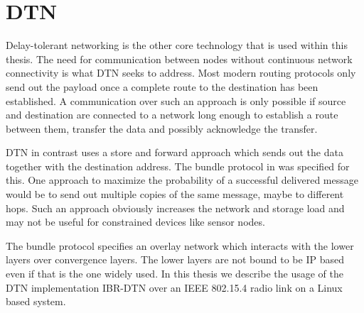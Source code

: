 \section{DTN}
\label{introdtn}
Delay-tolerant networking is the other core technology that is used within this
thesis. The need for communication between nodes without continuous network
connectivity is what DTN seeks to address. Most modern routing protocols only
send out the payload once a complete route to the destination has been established.
A communication over such an approach is only possible if source and destination
are connected to a network long enough to establish a route between them,
transfer the data and possibly acknowledge the transfer.

DTN in contrast uses a store and forward approach which sends out the data
together with the destination address. The bundle protocol in
\cite{RFC5050} was specified for this. One approach to maximize the probability
of a successful delivered message would be to send out multiple copies of the
same message, maybe to different hops. Such an approach obviously increases the
network and storage load and may not be useful for constrained devices like
sensor nodes.

The bundle protocol specifies an overlay network which interacts with the lower
layers over convergence layers. The lower layers are not bound to be IP
based even if that is the one widely used. In this thesis we describe the usage
of the DTN implementation IBR-DTN over an IEEE 802.15.4 radio link on a Linux
based system.
